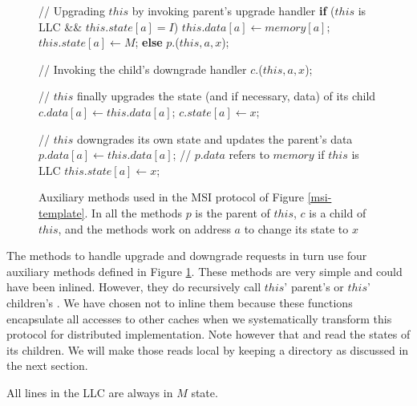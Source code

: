 \begin{figure}
\small

\begin{algorithmic}
\State // Upgrading $this$ by invoking parent's upgrade handler
  \State \textbf{if} ($this$ is LLC \&\& $this.state[a] = I$) \bopen
  \State \;\;\;\; $this.data[a] \gets memory[a]$;
  \State \;\;\;\; $this.state[a] \gets M$;
  \State \bclose \textbf{else}
  \State \;\;\;\; \call{} $p.$\uReq($this, a, x$);  
\EndProc

\State // Invoking the child's downgrade handler
  \State \call{} $c.$\dReq($this, a, x$);
\EndProc

\State // $this$ finally upgrades the state (and if necessary, data) of its child
    \State $c.data[a] \gets this.data[a]$;
  \EndIf
  \State $c.state[a] \gets x$;
\EndProc

\State // $this$ downgrades its own state and updates the parent's data
    \State $p.data[a] \gets this.data[a]$;
    \State // $p.data$ refers to $memory$ if $this$ is LLC
  \EndIf
  \State $this.state[a] \gets x$;
\EndProc
\end{algorithmic}

\caption{Auxiliary methods used in the MSI protocol of Figure \ref{msi-template}. In all the methods $p$ is the parent of $this$, $c$ is a child of $this$, and the methods work on address $a$ to change its state to $x$}
\label{atomic}
\end{figure}

The methods to handle upgrade and downgrade requests in turn use four auxiliary methods defined in Figure \ref{atomic}. These methods are very simple and could have been inlined. However, they do recursively call $this$' parent's \uReq{} or $this$' children's \uReq{}. We have chosen not to inline them because these functions encapsulate all accesses to other caches when we systematically transform this protocol for distributed implementation. Note however that \uReq{} and \dReq{} read the states of its children. We will make those reads local by keeping a directory as discussed in the next section.

All lines in the LLC are always in $M$ state.
